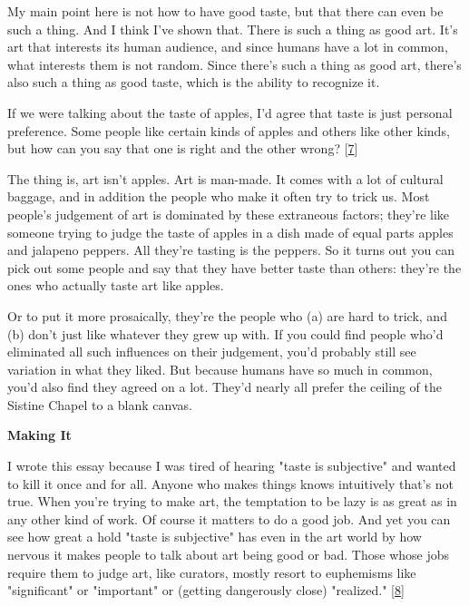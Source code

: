 My main point here is not
                  how to have good taste, but that there can even be such a
                  thing. And I think I've shown that. There is such a thing as
                  good art. It's art that interests its human audience, and
                  since humans have a lot in common, what interests them is not
                  random. Since there's such a thing as good art, there's also
                  such a thing as good taste, which is the ability to recognize
                  it.

If we were talking about the taste of apples,
                  I'd agree that taste is just personal preference. Some people
                  like certain kinds of apples and others like other kinds, but
                  how can you say that one is right and the other wrong?
                  [\href{\#f7n}{7}]

The thing is, art isn't apples. Art is man-made.
                  It comes with a lot of cultural baggage, and in addition the
                  people who make it often try to trick us. Most people's
                  judgement of art is dominated by these extraneous factors;
                  they're like someone trying to judge the taste of apples in a
                  dish made of equal parts apples and jalapeno peppers. All
                  they're tasting is the peppers. So it turns out you can pick
                  out some people and say that they have better taste than
                  others: they're the ones who actually taste art like
                  apples.

Or to put it more prosaically, they're the
                  people who (a) are hard to trick, and (b) don't just like
                  whatever they grew up with. If you could find people who'd
                  eliminated all such influences on their judgement, you'd
                  probably still see variation in what they liked. But because
                  humans have so much in common, you'd also find they agreed on
                  a lot. They'd nearly all prefer the ceiling of the Sistine
                  Chapel to a blank canvas.

\textbf{Making It}

I wrote this essay because I was tired of hearing
                  "taste is subjective" and wanted to kill it once and for all.
                  Anyone who makes things knows intuitively that's not true.
                  When you're trying to make art, the temptation to be lazy is
                  as great as in any other kind of work. Of course it matters to
                  do a good job. And yet you can see how great a hold "taste is
                  subjective" has even in the art world by how nervous it makes
                  people to talk about art being good or bad. Those whose jobs
                  require them to judge art, like curators, mostly resort to
                  euphemisms like "significant" or "important" or (getting
                  dangerously close) "realized."
                  [\href{\#f8n}{8}]


